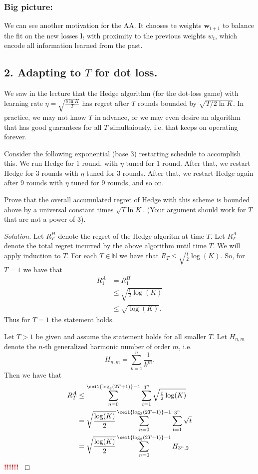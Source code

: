 \documentclass[10pt, a4paper, twoside]{amsart}
\theoremstyle{plain}
\newcommand{\N}{\ensuremath{\mathbb{N}}}
\DeclarePairedDelimiter{\ceil}\lceil\rceil
\newenvironment{solution}
               {\let\oldqedsymbol=\qedsymbol
                \renewcommand{\qedsymbol}{$\blacktriangleleft$}
                \begin{proof}[Solution]}
               {\end{proof}
                \renewcommand{\qedsymbol}{\oldqedsymbol}}
\newcommand{\TODO}{\textcolor{red}{\textbf{!!!!!! }}}
\begin{document}
\subsubsection*{Big picture:}
We can see another motivation for the AA. It chooses te weights $\mathbf{w}_{t+1}$ to balance the fit on the new losses $\mathbf{l}_t$ with proximity to the previous weights $w_t$, which encode all information learned from the past. 

\subsection*{2. Adapting to $T$ for dot loss.}
We saw in the lecture that the Hedge algorithm (for the dot-loss game) with learning rate $\eta = \sqrt{\frac{8\ln K}{T}}$ has regret after $T$ rounds bounded by $\sqrt{T/ 2 \ln K}$. In practice, we may not know $T$ in advance, or we may even desire an algorithm that has good guarantees for all $T$ simultaiously, i.e. that keeps on operating forever.

Consider the following exponential (base $3$) restarting schedule to accomplish this. We run Hedge for $1$ round, with $\eta$ tuned for $1$ round. After that, we restart Hedge for $3$ rounds with $\eta$ tuned for $3$ rounds. After that, we restart Hedge again after $9$ rounds with $\eta$ tuned for $9$ rounds, and so on.

Prove that the overall accumulated regret of Hedge with this scheme is bounded above by a universal constant times $\sqrt{T \ln K}$. (Your argument should work for $T$ that are not a power of $3$).

\begin{solution}
 Let $R^{H}_T$ denote the regret of the Hedge algoritm at time $T$.
 Let $R^{A}_T$ denote the total regret incurred by the above algorithm until time $T$.
 We will apply induction to $T$. For each $T \in \N$ we have that $R_T \leq \sqrt{\tfrac{t}{2}\log(K)}$.
 So, for $T=1$ we have that 
 \begin{align*}
  R^A_1 &= R^H_1 \\
  & \leq \sqrt{\tfrac{1}{2}\log(K)} \\
  & \leq \sqrt{\log(K)}.
  \end{align*}
Thus for $T=1$ the statement holds.

Let $T > 1$ be given and assume the statement holds for all smaller $T$.
 Let $H_{n,m}$ denote the $n$-th generalized harmonic number of order $m$, i.e.
 \begin{equation*}
  H_{n,m}=\sum_{k=1}^{n}\frac{1}{k^m}.
 \end{equation*}
 Then we have that
 \begin{align*}
  R^{A}_{T} &\leq \sum_{n=0}^{\ceil{\log_3(2T + 1)} - 1} \sum_{t=1}^{3^n} \sqrt{\tfrac{t}{2}\log(K)} \\
  &=\sqrt{\frac{\log(K)}{2}} \sum_{n=0}^{\ceil{\log_3(2T + 1)} - 1} \sum_{t=1}^{3^n} \sqrt{t} \\
  &=\sqrt{\frac{\log(K)}{2}} \sum_{n=0}^{\ceil{\log_3(2T + 1)} - 1} H_{3^n,2} \\
 \end{align*}
 \TODO
\end{solution}
\end{document}
